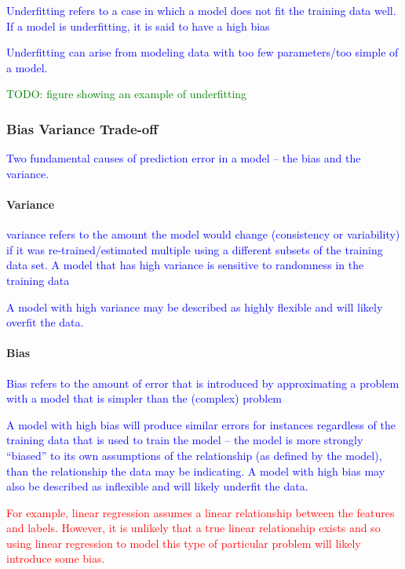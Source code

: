 \textcolor{blue}{Underfitting refers to a case in which a model does not fit the training data well. If a model is underfitting, it is said to have a high bias}

\textcolor{blue}{Underfitting can arise from modeling data with too few parameters/too simple of a model.}

\textcolor{green}{TODO: figure showing an example of underfitting}


\subsubsection{Bias Variance Trade-off}

\textcolor{blue}{Two fundamental causes of prediction error in a model -- the bias and the variance.}

\paragraph{Variance}
\textcolor{blue}{variance refers to the amount the model would change (consistency or variability) if it was re-trained/estimated multiple using a different subsets of the training data set. A model that has high variance is sensitive to randomness in the training data}

\textcolor{blue}{A model with high variance may be described as highly flexible and will likely overfit the data.}


\paragraph{Bias}
\textcolor{blue}{Bias refers to the amount of error that is introduced by approximating a problem with a model that is simpler than the (complex) problem}

\textcolor{blue}{A model with high bias will produce similar errors for instances regardless of the training data that is used to train the model -- the model is more strongly ``biased'' to its own assumptions of the relationship (as defined by the model), than the relationship the data may be indicating. A model with high bias may also be described as inflexible and will likely underfit the data.}


\textcolor{red}{For example, linear regression assumes a linear relationship between the features and labels. However, it is unlikely that a true linear relationship exists and so using linear regression to model this type of particular problem will likely introduce some bias.}

